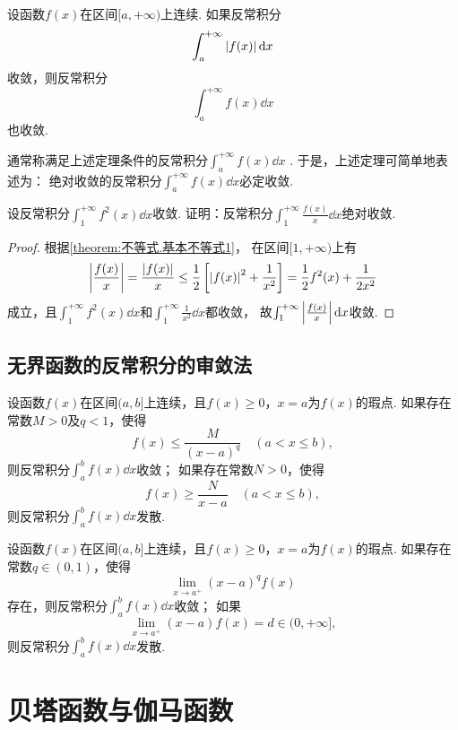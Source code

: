 \begin{theorem}\label{theorem:定积分.绝对收敛的无穷限反常积分必收敛}
设函数\(f(x)\)在区间\([a,+\infty)\)上连续.
如果反常积分\[
\int_a^{+\infty} \abs{f(x)} \dd{x}
\]收敛，则反常积分\[
\int_a^{+\infty} f(x) \dd{x}
\]也收敛.
\end{theorem}
通常称满足上述定理条件的反常积分\(\int_a^{+\infty} f(x) \dd{x}\) .
于是，上述定理可简单地表述为：
绝对收敛的反常积分\(\int_a^{+\infty} f(x) \dd{x}\)必定收敛.

\begin{example}
设反常积分\(\int_1^{+\infty} f^2(x) \dd{x}\)收敛.
证明：反常积分\(\int_1^{+\infty} \frac{f(x)}{x} \dd{x}\)绝对收敛.
\begin{proof}
根据\cref{theorem:不等式.基本不等式1}，%
在区间\([1,+\infty)\)上有\[
\abs{\frac{f(x)}{x}}
= \frac{\abs{f(x)}}{x}
\leq \frac{1}{2} \left[
	\abs{f(x)}^2 + \frac{1}{x^2}
\right]
= \frac{1}{2} f^2(x) + \frac{1}{2x^2}
\]成立，且\(\int_1^{+\infty} f^2(x) \dd{x}\)和\(\int_1^{+\infty} \frac{1}{x^2} \dd{x}\)都收敛，%
故\(\int_1^{+\infty} \abs{\frac{f(x)}{x}} \dd{x}\)收敛.
\end{proof}
\end{example}

\subsection{无界函数的反常积分的审敛法}
\begin{theorem}[比较审敛法]\label{theorem:定积分.无界函数的反常积分的比较审敛法}
设函数\(f(x)\)在区间\((a,b]\)上连续，且\(f(x) \geq 0\)，\(x=a\)为\(f(x)\)的瑕点.
如果存在常数\(M > 0\)及\(q < 1\)，使得\[
f(x) \leq \frac{M}{(x-a)^q} \quad (a < x \leq b),
\]则反常积分\(\int_a^b f(x) \dd{x}\)收敛；
如果存在常数\(N > 0\)，使得\[
f(x) \geq \frac{N}{x - a} \quad (a < x \leq b),
\]则反常积分\(\int_a^b f(x) \dd{x}\)发散.
\end{theorem}

\begin{theorem}[极限审敛法]\label{theorem:定积分.无界函数的反常积分的极限审敛法}
设函数\(f(x)\)在区间\((a,b]\)上连续，且\(f(x) \geq 0\)，\(x=a\)为\(f(x)\)的瑕点.
如果存在常数\(q \in (0,1)\)，使得\[
\lim\limits_{x \to a^+} (x-a)^q f(x)
\]存在，则反常积分\(\int_a^b f(x) \dd{x}\)收敛；
如果\[
\lim\limits_{x \to a^+} (x-a) f(x) = d \in (0,+\infty],
\]则反常积分\(\int_a^b f(x) \dd{x}\)发散.
\end{theorem}

\section{贝塔函数与伽马函数}
